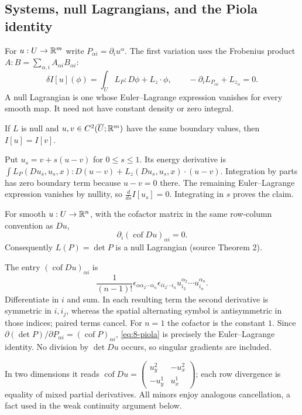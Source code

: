 \subsection{Systems, null Lagrangians, and the Piola identity}
For $u:U\to\mathbb{R}^m$ write $P_{\alpha i}=\partial_i u^\alpha$.
The first variation uses the Frobenius product $A:B=\sum_{\alpha,i}A_{\alpha i}B_{\alpha i}$:
\[
 \delta I[u](\phi)=\int_U L_P:D\phi+L_z\cdot\phi,
 \qquad -\partial_i L_{P_{\alpha i}}+L_{z_\alpha}=0.
\]
A null Lagrangian is one whose Euler--Lagrange expression vanishes for
every smooth map. It need not have constant density or zero integral.
\Needspace{55mm}
\begin{theorem}
If $L$ is null and $u,v\in C^2(\overline U;\mathbb{R}^m)$ have the same boundary
values, then $I[u]=I[v]$.
\end{theorem}
\begin{expandedproof}
Put $u_s=v+s(u-v)$ for $0\leq s\leq1$. Its energy derivative is
$\int L_P(Du_s,u_s,x):D(u-v)+L_z(Du_s,u_s,x)\cdot(u-v)$.
Integration by parts has zero boundary term because $u-v=0$ there.
The remaining Euler--Lagrange expression vanishes by nullity, so
$\frac d{ds}I[u_s]=0$. Integrating in $s$ proves the claim.
\end{expandedproof}

\Needspace{55mm}
\begin{lemma}
For smooth $u:U\to\mathbb{R}^n$, with the cofactor matrix in the same row-column
convention as $Du$,
\begin{equation}\label{eq:8-piola}
 \partial_i(\operatorname{cof}Du)_{\alpha i}=0.
\end{equation}
Consequently $L(P)=\det P$ is a null Lagrangian (source Theorem 2).
\end{lemma}
\begin{expandedproof}
The entry $(\operatorname{cof}Du)_{\alpha i}$ is
\[
 \frac1{(n-1)!}\epsilon_{\alpha\alpha_2\cdots\alpha_n}
 \epsilon_{ii_2\cdots i_n}
 u^{\alpha_2}_{i_2}\cdots u^{\alpha_n}_{i_n}.
\]
Differentiate in $i$ and sum. In each resulting term the second derivative
is symmetric in $i,i_j$, whereas the spatial alternating symbol is
antisymmetric in those indices; paired terms cancel.
For $n=1$ the cofactor is the constant $1$.
Since $\partial(\det P)/\partial P_{\alpha i}=(\operatorname{cof}P)_{\alpha i}$,
\eqref{eq:8-piola} is precisely the Euler--Lagrange identity.
No division by $\det Du$ occurs, so singular gradients are included.
\end{expandedproof}
\Needspace{55mm}
In two dimensions it reads
$\operatorname{cof}Du=\left(\begin{smallmatrix}u^2_y&-u^2_x\\-u^1_y&u^1_x\end{smallmatrix}\right)$;
each row divergence is equality of mixed partial derivatives.
All minors enjoy analogous cancellation, a fact used in the weak continuity
argument below.

